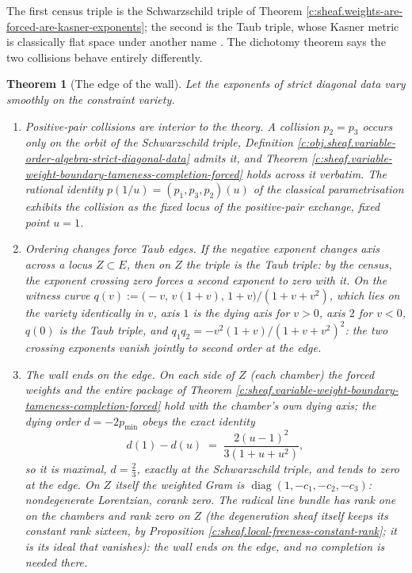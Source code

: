 \documentclass[11pt]{article}
\newtheorem{theorem}{Theorem}[section]
\theoremstyle{definition}
\theoremstyle{plain}
\newcommand{\changedmark}[2]{\marginpar{\raggedright\scriptsize\color{#1}#2}}
\begin{document}
\label{c:note.sheaf.setting-exponent-collisions-edge-wall-2}
The first census triple is the Schwarzschild triple of Theorem \ref{c:sheaf.weights-are-forced-are-kasner-exponents}; the second is the Taub triple, whose Kasner metric is classically flat space under another name \cite{Kasner1921}. The dichotomy theorem says the two collisions behave entirely differently.

\begin{theorem}[The edge of the wall]\label{c:sheaf.edge-wall}
\changedmark{gray}{reworded}
Let the exponents of strict diagonal data vary smoothly on the constraint variety.
\begin{enumerate}
\item \emph{Positive-pair collisions are interior to the theory.} A collision $p_2 = p_3$ occurs only on the orbit of the Schwarzschild triple, Definition \ref{c:obj.sheaf.variable-order-algebra-strict-diagonal-data} admits it, and Theorem \ref{c:sheaf.variable-weight-boundary-tameness-completion-forced} holds across it verbatim. The rational identity $p(1/u) = (p_1, p_3, p_2)(u)$ of the classical parametrisation exhibits the collision as the fixed locus of the positive-pair exchange, fixed point $u = 1$.
\item \emph{Ordering changes force Taub edges.} If the negative exponent changes axis across a locus $Z \subset E$, then on $Z$ the triple is the Taub triple: by the census, the exponent crossing zero forces a second exponent to zero with it. On the witness curve $q(v) := \bigl(-v,\, v(1+v),\, 1+v\bigr)/(1+v+v^2)$, which lies on the variety identically in $v$, axis $1$ is the dying axis for $v > 0$, axis $2$ for $v < 0$, $q(0)$ is the Taub triple, and $q_1q_2 = -v^2(1+v)/(1+v+v^2)^2$: the two crossing exponents vanish jointly to second order at the edge.
\item \emph{The wall ends on the edge.} On each side of $Z$ (each \emph{chamber}) the forced weights and the entire package of Theorem \ref{c:sheaf.variable-weight-boundary-tameness-completion-forced} hold with the chamber's own dying axis; the dying order $d = -2p_{\min}$ obeys the exact identity
\[
d(1) - d(u) \;=\; \frac{2(u-1)^2}{3(1+u+u^2)},
\]
so it is \emph{maximal}, $d = \tfrac23$, exactly at the Schwarzschild triple, and tends to zero at the edge. On $Z$ itself the weighted Gram is $\operatorname{diag}(1,-c_1,-c_2,-c_3)$: nondegenerate Lorentzian, corank zero. The radical line bundle has rank one on the chambers and rank zero on $Z$ (the degeneration sheaf itself keeps its constant rank sixteen, by Proposition \ref{c:sheaf.local-freeness-constant-rank}; it is its ideal that vanishes): the wall ends on the edge, and no completion is needed there.

\end{enumerate}
\end{theorem}
\end{document}
